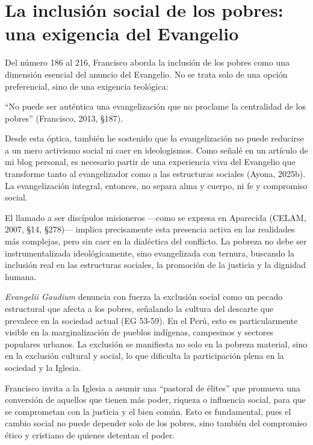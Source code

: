 \documentclass[12pt]{article}
\begin{document}
\section{La inclusión social de los pobres: una exigencia del Evangelio}

Del número 186 al 216, Francisco aborda la inclusión de los pobres como una dimensión esencial del anuncio del Evangelio. No se trata solo de una opción preferencial, sino de una exigencia teológica: 
\begin{displayquote}
	“No puede ser auténtica una evangelización que no proclame la centralidad de los pobres” (Francisco, 2013, §187).
\end{displayquote}

Desde esta óptica, también he sostenido que la evangelización no puede reducirse a un mero activismo social ni caer en ideologismos. Como señalé en un artículo de mi blog personal, es necesario partir de una experiencia viva del Evangelio que transforme tanto al evangelizador como a las estructuras sociales (Ayona, 2025b). La evangelización integral, entonces, no separa alma y cuerpo, ni fe y compromiso social.

El llamado a ser discípulos misioneros —como se expresa en Aparecida (CELAM, 2007, §14, §278)— implica precisamente esta presencia activa en las realidades más complejas, pero sin caer en la dialéctica del conflicto. La pobreza no debe ser instrumentalizada ideológicamente, sino evangelizada con ternura, buscando la inclusión real en las estructuras sociales, la promoción de la justicia y la dignidad humana.

\textit{Evangelii Gaudium} denuncia con fuerza la exclusión social como un pecado estructural que afecta a los pobres, señalando la cultura del descarte que prevalece en la sociedad actual (EG 53-59). En el Perú, esto es particularmente visible en la marginalización de pueblos indígenas, campesinos y sectores populares urbanos. La exclusión se manifiesta no solo en la pobreza material, sino en la exclusión cultural y social, lo que dificulta la participación plena en la sociedad y la Iglesia.

Francisco invita a la Iglesia a asumir una “pastoral de élites” que promueva una conversión de aquellos que tienen más poder, riqueza o influencia social, para que se comprometan con la justicia y el bien común. Esto es fundamental, pues el cambio social no puede depender solo de los pobres, sino también del compromiso ético y cristiano de quienes detentan el poder.
\end{document}
